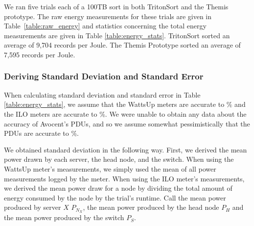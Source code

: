 \begin{table}
\centering
\caption{\label{table:energy_stats} Statistics for the energy measurements
  presented in Table~\ref{table:raw_energy}}
\end{table}

We ran five trials each of a 100TB sort in both TritonSort and the Themis
prototype. The raw energy measurements for these trials are given in
Table~\ref{table:raw_energy} and statistics concerning the total energy
measurements are given in Table \ref{table:energy_stats}. TritonSort sorted an
average of 9,704 records per Joule. The Themis Prototype sorted an average of
7,595 records per Joule.


\subsubsection{Deriving Standard Deviation and Standard Error}

When calculating standard deviation and standard error in Table
\ref{table:energy_stats}, we assume that the WattsUp meters are accurate to
\% and the ILO meters are accurate to \%. We were unable to
obtain any data about the accuracy of Avocent's PDUs, and so we assume somewhat
pessimistically that the PDUs are accurate to \%.

We obtained standard deviation in the following way. First, we derived the mean
power drawn by each server, the head node, and the switch. When using the
WattsUp meter's measurements, we simply used the mean of all power measurements
logged by the meter. When using the ILO meter's measurements, we derived the
mean power draw for a node by dividing the total amount of energy consumed by
the node by the trial's runtime. Call the mean power produced by server $X$
$P_{N_X}$, the mean power produced by the head node $P_H$ and the mean power
produced by the switch $P_S$.

